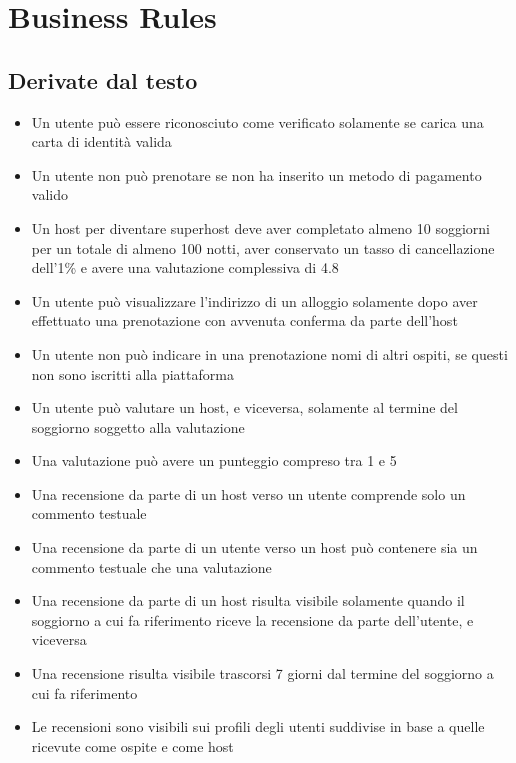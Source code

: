 \section{Business Rules}
\subsection{Derivate dal testo}
\begin{itemize}
  \item Un utente può essere riconosciuto come verificato solamente se carica una carta di identità valida
  \item Un utente non può prenotare se non ha inserito un metodo di pagamento valido
  \item Un host per diventare superhost deve aver completato almeno 10 soggiorni per un totale di almeno 100 notti, aver conservato un tasso di cancellazione dell'1\% e avere una valutazione complessiva di 4.8 
  \item Un utente può visualizzare l'indirizzo di un alloggio solamente dopo aver effettuato una prenotazione con avvenuta conferma da parte dell'host
  \item Un utente non può indicare in una prenotazione nomi di altri ospiti, se questi non sono iscritti alla piattaforma 
  \item Un utente può valutare un host, e viceversa, solamente al termine del soggiorno soggetto alla valutazione
  \item Una valutazione può avere un punteggio compreso tra 1 e 5
  \item Una recensione da parte di un host verso un utente comprende solo un commento testuale
  \item Una recensione da parte di un utente verso un host può contenere sia un commento testuale che una valutazione
  \item Una recensione da parte di un host risulta visibile solamente quando il soggiorno a cui fa riferimento riceve la recensione da parte dell'utente, e viceversa
  \item Una recensione risulta visibile trascorsi 7 giorni dal termine del soggiorno a cui fa riferimento
  \item Le recensioni sono visibili sui profili degli utenti suddivise in base a quelle ricevute come ospite e come host
\end{itemize}

